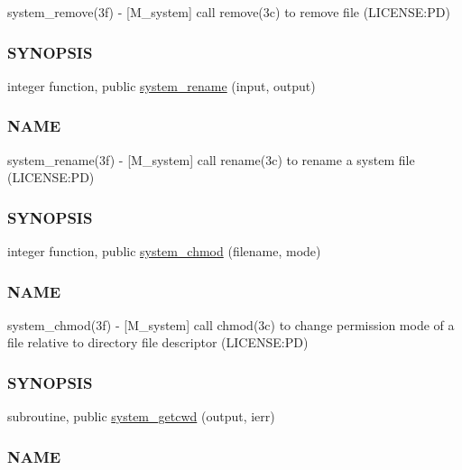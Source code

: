 \begin{DoxyCompactItemize}
\begin{DoxyCompactList}
system\+\_\+remove(3f) -\/ \mbox{[}M\+\_\+system\mbox{]} call remove(3c) to remove file (L\+I\+C\+E\+N\+SE\+:PD) \subsubsection*{S\+Y\+N\+O\+P\+S\+IS}\end{DoxyCompactList}\item 
integer function, public \mbox{\hyperlink{namespacem__system_adfbaf3d17790da9ba0c520683d5b8003}{system\+\_\+rename}} (input, output)
\begin{DoxyCompactList}\small\item\em \subsubsection*{N\+A\+ME}

system\+\_\+rename(3f) -\/ \mbox{[}M\+\_\+system\mbox{]} call rename(3c) to rename a system file (L\+I\+C\+E\+N\+SE\+:PD) \subsubsection*{S\+Y\+N\+O\+P\+S\+IS}\end{DoxyCompactList}\item 
integer function, public \mbox{\hyperlink{namespacem__system_ace9ce0c8a9c8341a76b8903cd2390ce3}{system\+\_\+chmod}} (filename, mode)
\begin{DoxyCompactList}\small\item\em \subsubsection*{N\+A\+ME}

system\+\_\+chmod(3f) -\/ \mbox{[}M\+\_\+system\mbox{]} call chmod(3c) to change permission mode of a file relative to directory file descriptor (L\+I\+C\+E\+N\+SE\+:PD) \subsubsection*{S\+Y\+N\+O\+P\+S\+IS}\end{DoxyCompactList}\item 
subroutine, public \mbox{\hyperlink{namespacem__system_a5a32db818a9ffb0a4ea724e95356c560}{system\+\_\+getcwd}} (output, ierr)
\begin{DoxyCompactList}\small\item\em \subsubsection*{N\+A\+ME}


\end{DoxyCompactList}
\end{DoxyCompactItemize}
